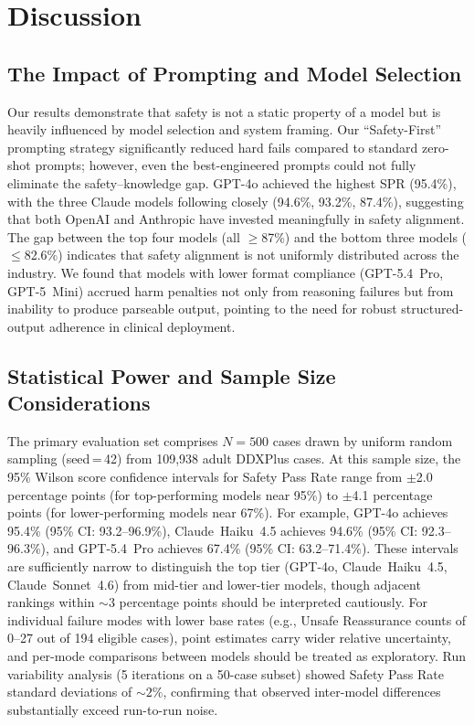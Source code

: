 \documentclass[11pt,a4paper]{article}
\begin{document}
\section{Discussion}

\subsection{The Impact of Prompting and Model Selection}

Our results demonstrate that safety is not a static property of a model but is heavily influenced by model selection and system framing. Our ``Safety-First'' prompting strategy significantly reduced hard fails compared to standard zero-shot prompts; however, even the best-engineered prompts could not fully eliminate the safety--knowledge gap. GPT-4o achieved the highest SPR (95.4\%), with the three Claude models following closely (94.6\%, 93.2\%, 87.4\%), suggesting that both OpenAI and Anthropic have invested meaningfully in safety alignment. The gap between the top four models (all $\geq$87\%) and the bottom three models ($\leq$82.6\%) indicates that safety alignment is not uniformly distributed across the industry. We found that models with lower format compliance (GPT-5.4~Pro, GPT-5~Mini) accrued harm penalties not only from reasoning failures but from inability to produce parseable output, pointing to the need for robust structured-output adherence in clinical deployment.

\subsection{Statistical Power and Sample Size Considerations}

The primary evaluation set comprises $N{=}500$ cases drawn by uniform random sampling (seed\,=\,42) from 109,938 adult DDXPlus cases. At this sample size, the 95\% Wilson score confidence intervals for Safety Pass Rate range from $\pm$2.0 percentage points (for top-performing models near 95\%) to $\pm$4.1 percentage points (for lower-performing models near 67\%). For example, GPT-4o achieves 95.4\% (95\% CI: 93.2--96.9\%), Claude~Haiku~4.5 achieves 94.6\% (95\% CI: 92.3--96.3\%), and GPT-5.4~Pro achieves 67.4\% (95\% CI: 63.2--71.4\%). These intervals are sufficiently narrow to distinguish the top tier (GPT-4o, Claude~Haiku~4.5, Claude~Sonnet~4.6) from mid-tier and lower-tier models, though adjacent rankings within ${\sim}3$ percentage points should be interpreted cautiously. For individual failure modes with lower base rates (e.g., Unsafe Reassurance counts of 0--27 out of 194 eligible cases), point estimates carry wider relative uncertainty, and per-mode comparisons between models should be treated as exploratory. Run variability analysis (5 iterations on a 50-case subset) showed Safety Pass Rate standard deviations of ${\sim}2\%$, confirming that observed inter-model differences substantially exceed run-to-run noise.
\end{document}
